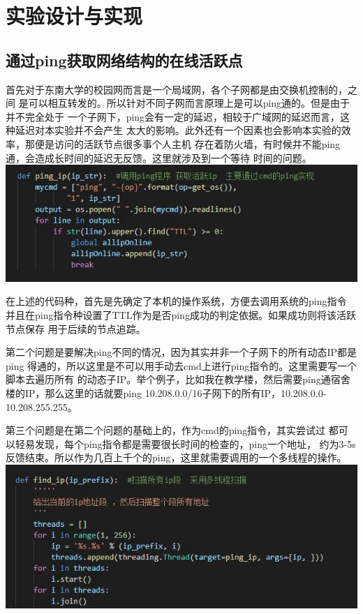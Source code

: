 \documentclass{article} %
\begin{document}
    \section{\LARGE 实验设计与实现}
        \subsection{\Large 通过ping获取网络结构的在线活跃点}
        \par 首先对于东南大学的校园网而言是一个局域网，各个子网都是由交换机控制的，之间
        是可以相互转发的。所以针对不同子网而言原理上是可以ping通的。但是由于并不完全处于
        一个子网下，ping会有一定的延迟，相较于广域网的延迟而言，这种延迟对本实验并不会产生
        太大的影响。此外还有一个因素也会影响本实验的效率，那便是访问的活跃节点很多事个人主机
        存在着防火墙，有时候并不能ping通，会造成长时间的延迟无反馈。这里就涉及到一个等待
        时间的问题。\\
        \includegraphics[scale=0.7]{pic/ping代码1.JPG}
        \par 在上述的代码种，首先是先确定了本机的操作系统，方便去调用系统的ping指令
        并且在ping指令种设置了TTL作为是否ping成功的判定依据。如果成功则将该活跃节点保存
        用于后续的节点追踪。
        \par 第二个问题是要解决ping不同的情况，因为其实并非一个子网下的所有动态IP都是ping
        得通的，所以这里是不可以用手动去cmd上进行ping指令的。这里需要写一个脚本去遍历所有
        的动态子IP。举个例子，比如我在教学楼，然后需要ping通宿舍楼的IP，那么这里的话就要ping
        10.208.0.0/16子网下的所有IP，10.208.0.0-10.208.255.255。
        \par 第三个问题是在第二个问题的基础上的，作为cmd的ping指令，其实尝试过
        都可以轻易发现，每个ping指令都是需要很长时间的检查的，ping一个地址，
        约为3-5s反馈结束。所以作为几百上千个的ping，这里就需要调用的一个多线程的操作。
        \\
        \includegraphics[scale=0.7]{pic/ping代码2.JPG}
\end{document}
